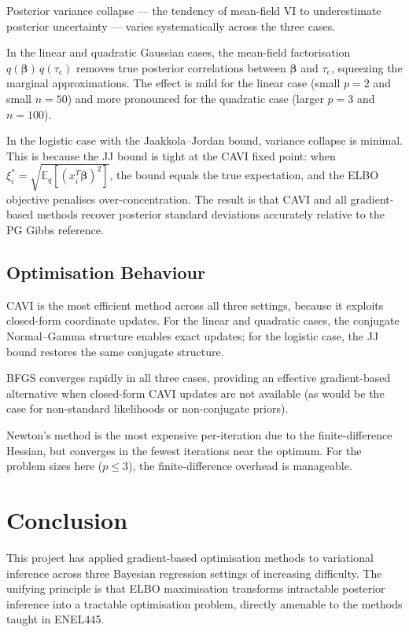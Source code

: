 \documentclass[11pt,a4paper]{article}
\newcommand{\E}{\mathbb{E}}
\begin{document}
Posterior variance collapse --- the tendency of mean-field VI to underestimate posterior
uncertainty --- varies systematically across the three cases.

In the linear and quadratic Gaussian cases, the mean-field factorisation
$q(\bm{\beta})\,q(\tau_e)$ removes true posterior correlations between $\bm{\beta}$ and
$\tau_e$, squeezing the marginal approximations.
The effect is mild for the linear case (small $p=2$ and small $n=50$) and more pronounced
for the quadratic case (larger $p=3$ and $n=100$).

In the logistic case with the Jaakkola--Jordan bound, variance collapse is minimal.
This is because the JJ bound is tight at the CAVI fixed point: when
$\xi_i^* = \sqrt{\E_q[(x_i^T\bm{\beta})^2]}$, the bound equals the true expectation,
and the ELBO objective penalises over-concentration.
The result is that CAVI and all gradient-based methods recover posterior standard
deviations accurately relative to the PG Gibbs reference.

\subsection{Optimisation Behaviour}

CAVI is the most efficient method across all three settings, because it exploits
closed-form coordinate updates.
For the linear and quadratic cases, the conjugate Normal--Gamma structure enables
exact updates; for the logistic case, the JJ bound restores the same conjugate structure.

BFGS converges rapidly in all three cases, providing an effective gradient-based
alternative when closed-form CAVI updates are not available (as would be the case for
non-standard likelihoods or non-conjugate priors).

Newton's method is the most expensive per-iteration due to the finite-difference
Hessian, but converges in the fewest iterations near the optimum.
For the problem sizes here ($p \leq 3$), the finite-difference overhead is manageable.

\section*{Conclusion}

This project has applied gradient-based optimisation methods to variational inference
across three Bayesian regression settings of increasing difficulty.
The unifying principle is that ELBO maximisation transforms intractable posterior
inference into a tractable optimisation problem, directly amenable to the methods
taught in ENEL445.
\end{document}
